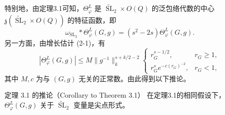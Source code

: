 特别地，由定理3.1可知，$\Theta_\varphi^L$ 是 $\widetilde{\operatorname{SL}}_2\times O(Q)$ 的泛包络代数的中心 $\mathfrak z(\widetilde{\operatorname{SL}}_2\times O(Q))$ 的特征函数，即
\[
 \omega_{\operatorname{SL}_2}*\Theta_\varphi^L(G,g)=(s^2-2s)\Theta_\varphi^L(G,g).
\]
另一方面，由增长估计 (2-1)，有
\begin{equation}
 |\Theta_\varphi^L(G,g)|\le M\|g^{-1}\|_k^{s+k/2-2}
 \begin{cases}r_G^{s-1/2},&r_G\ge1,\\r_G^s e^{-c(r_G)^{-2}},&r_G<1,\end{cases}\tag{3-4}
\end{equation}
其中 $M,c$ 为与 $(G,g)$ 无关的正常数。由此得到以下推论。
\begin{originaltheorem}{定理 3.1 的推论（Corollary to Theorem 3.1）}
在定理3.1的相同假设下，$\Theta_\varphi^L(G,g)$ 关于 $\widetilde{\operatorname{SL}}_2$ 变量是尖点形式。
\end{originaltheorem}

